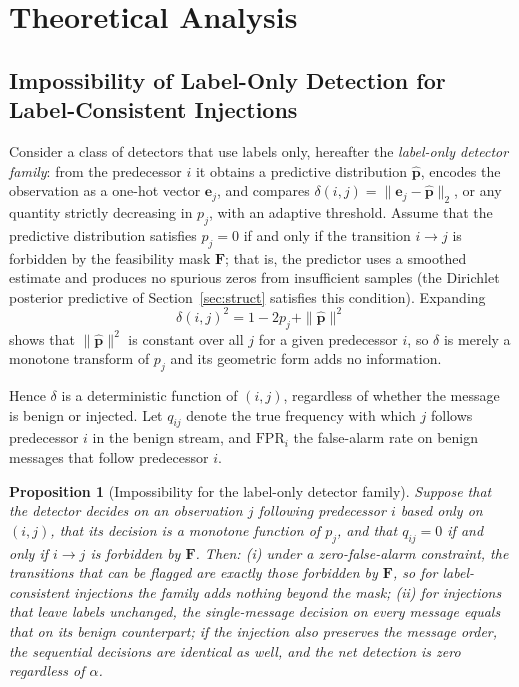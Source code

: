 \documentclass[manuscript,screen,review]{acmart}
\newtheorem{proposition}[theorem]{Proposition}%
\begin{document}
\section{Theoretical Analysis}
\label{sec:theory}

\subsection{Impossibility of Label-Only Detection for Label-Consistent Injections}
\label{sec:ta}

Consider a class of detectors that use labels only, hereafter the \emph{label-only detector family}: from the predecessor $i$ it obtains a predictive distribution $\hat{\mathbf p}$, encodes the observation as a one-hot vector $\mathbf e_j$, and compares $\delta(i,j)=\|\mathbf e_j-\hat{\mathbf p}\|_2$, or any quantity strictly decreasing in $p_j$, with an adaptive threshold. Assume that the predictive distribution satisfies $p_j=0$ if and only if the transition $i\to j$ is forbidden by the feasibility mask $\mathbf F$; that is, the predictor uses a smoothed estimate and produces no spurious zeros from insufficient samples (the {Dirichlet} posterior predictive of Section~\ref{sec:struct} satisfies this condition). Expanding
\begin{equation}
  \delta(i,j)^2=1-2p_j+\|\hat{\mathbf p}\|^2
\end{equation}
shows that $\|\hat{\mathbf p}\|^2$ is constant over all $j$ for a given predecessor $i$, so $\delta$ is merely a monotone transform of $p_j$ and its geometric form adds no information.

Hence $\delta$ is a deterministic function of $(i,j)$, regardless of whether the message is benign or injected. Let $q_{ij}$ denote the true frequency with which $j$ follows predecessor $i$ in the benign stream, and $\mathrm{FPR}_i$ the false-alarm rate on benign messages that follow predecessor $i$.

\begin{proposition}[Impossibility for the label-only detector family]
\label{prop:ta}
Suppose that the detector decides on an observation $j$ following predecessor $i$ based only on $(i,j)$, that its decision is a monotone function of $p_j$, and that $q_{ij}=0$ if and only if $i\to j$ is forbidden by $\mathbf F$. Then:
(i) under a zero-false-alarm constraint, the transitions that can be flagged are exactly those forbidden by $\mathbf F$, so for label-consistent injections the family adds nothing beyond the mask;
(ii) for injections that leave labels unchanged, the single-message decision on every message equals that on its benign counterpart; if the injection also preserves the message order, the sequential decisions are identical as well, and the net detection is zero regardless of $\alpha$.
\end{proposition}
\end{document}
